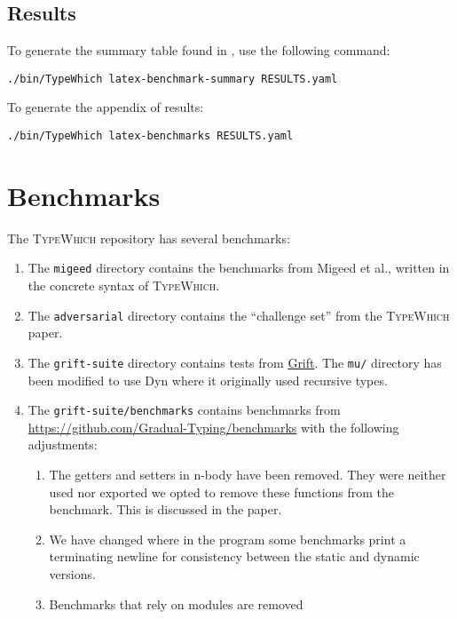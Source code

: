 \documentclass{article}
\newcommand{\system}{\textsc{TypeWhich}\xspace}
\begin{document}
\subsection{Results}

To generate the summary table found in \citet{typewhich}, use the following
command:
\begin{verbatim}
./bin/TypeWhich latex-benchmark-summary RESULTS.yaml 
\end{verbatim}

To generate the appendix of results:

\begin{verbatim}
./bin/TypeWhich latex-benchmarks RESULTS.yaml 
\end{verbatim}

\section{Benchmarks}

The \system repository has several benchmarks:

\begin{enumerate}
   
\item The \texttt{migeed} directory contains the benchmarks
from Migeed et al., written in the concrete syntax of \system.

\item The \texttt{adversarial} directory contains the ``challenge set'' from
the \system paper.

\item The \texttt{grift-suite} directory contains tests from
\href{https://github.com/Gradual-Typing/Grift/tree/master/tests/suite}{Grift}.
The
\texttt{mu/} directory has been modified to use Dyn where it originally used recursive
types.

\item The \texttt{grift-suite/benchmarks} contains benchmarks from
\url{https://github.com/Gradual-Typing/benchmarks} with the following
adjustments:

\begin{enumerate}
\item The getters and setters in n-body have been removed. They were neither used
nor exported we opted to remove these functions from the benchmark. This is
discussed in the paper.
\item We have changed where in the program some benchmarks print a terminating
newline for consistency between the static and dynamic versions.
\item Benchmarks that rely on modules are removed
\end{enumerate}
\end{enumerate}


\end{document}
